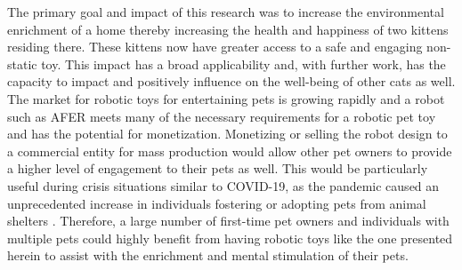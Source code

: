 The primary goal and impact of this research was to increase the environmental enrichment of a home thereby increasing the health and happiness of two kittens residing there. These kittens now have greater access to a safe and engaging non-static toy. This impact has a broad applicability and, with further work, has the capacity to impact and positively influence on the well-being of other cats as well.  
The market for robotic toys for entertaining pets is growing rapidly and a robot such as AFER meets many of the necessary requirements for a robotic pet toy and has the potential for monetization. Monetizing or selling the robot design to a commercial entity for mass production would allow other pet owners to provide a higher level of engagement to their pets as well. This would be particularly useful during crisis situations similar to COVID-19, as the pandemic caused an unprecedented increase in individuals fostering or adopting pets from animal shelters \cite{delgadillo_2020}. Therefore, a large number of first-time pet owners and individuals with multiple pets could highly benefit from having robotic toys like the one presented herein to assist with the enrichment and mental stimulation of their pets. 
